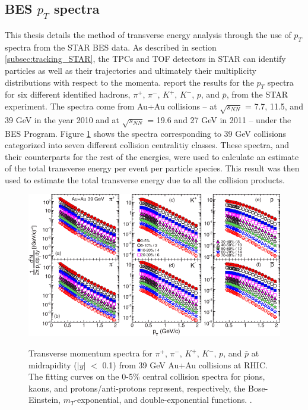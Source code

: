 \subsection{BES $p_{T}$ spectra}
This thesis details the method of transverse energy analysis through the use of $p_{T}$ spectra from the STAR BES data. As described in section \ref{subsec:tracking_STAR}, the TPCs and TOF detectors in STAR can identify particles as well as their trajectories and ultimately their multiplicity distributions with respect to the momenta. \citet{PhysRevC.96.044904} report the results for the $p_{T}$ spectra for six different identified hadrons, $\pi^+$, $\pi^-$, $K^+$, $K^-$, $p$, and $\bar{p}$, from the STAR experiment. The spectra come from Au+Au collisions -- at $\sqrt{s_{NN}}$ = 7.7, 11.5, and 39 GeV in the year 2010 and at $\sqrt{s_{NN}}$ = 19.6 and 27 GeV in 2011 -- under the BES Program. Figure \ref{fig:BESPaper_pTSpectra} \cite{PhysRevC.96.044904} shows the spectra corresponding to 39 GeV collisions categorized into seven different collision centralitiy classes. These spectra, and their counterparts for the rest of the energies, were used to calculate an estimate of the total transverse energy per event per particle species. This result was then used to estimate the total transverse energy due to all the collision products.
\begin{figure}[h]
  \centering
  \includegraphics[width=5.5in]{../figures/PhysRevC-96-044904_pTSpectra_39.png}\\
  \caption{Transverse momentum spectra for $\pi^{+}$, $\pi^{-}$, $K^+$, $K^{-}$, $p$, and $\bar{p}$ at midrapidity ($|y|$ $<$ 0.1) from 39 GeV Au+Au collisions at RHIC. The fitting curves on the 0-5\% central collision spectra for pions, kaons, and protons/anti-protons represent, respectively, the Bose-Einstein, $m_{T}$-exponential, and double-exponential functions. \cite{PhysRevC.96.044904}.}\label{fig:BESPaper_pTSpectra}
\end{figure}

